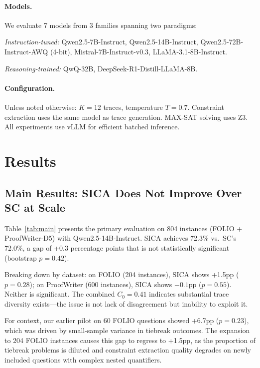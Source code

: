 \documentclass[11pt,a4paper]{article}
\begin{document}
\paragraph{Models.}
We evaluate 7 models from 3 families spanning two paradigms:

\noindent\emph{Instruction-tuned:}
Qwen2.5-7B-Instruct, Qwen2.5-14B-Instruct, Qwen2.5-72B-Instruct-AWQ (4-bit),
Mistral-7B-Instruct-v0.3, LLaMA-3.1-8B-Instruct.

\noindent\emph{Reasoning-trained:}
QwQ-32B, DeepSeek-R1-Distill-LLaMA-8B.

\paragraph{Configuration.}
Unless noted otherwise: $K=12$ traces, temperature $T=0.7$.
Constraint extraction uses the same model as trace generation.
MAX-SAT solving uses Z3.
All experiments use vLLM for efficient batched inference.

\section{Results}
\label{sec:results}

\subsection{Main Results: SICA Does Not Improve Over SC at Scale}
\label{sec:main_results}

Table~\ref{tab:main} presents the primary evaluation on 804 instances (FOLIO + ProofWriter-D5) with Qwen2.5-14B-Instruct.
SICA achieves 72.3\% vs.\ SC's 72.0\%, a gap of +0.3 percentage points that is not statistically significant (bootstrap $p=0.42$).

Breaking down by dataset: on FOLIO (204 instances), SICA shows +1.5pp ($p=0.28$); on ProofWriter (600 instances), SICA shows $-0.1$pp ($p=0.55$).
Neither is significant.
The combined $C_0=0.41$ indicates substantial trace diversity exists---the issue is not lack of disagreement but inability to exploit it.

For context, our earlier pilot on 60 FOLIO questions showed +6.7pp ($p=0.23$), which was driven by small-sample variance in tiebreak outcomes.
The expansion to 204 FOLIO instances causes this gap to regress to +1.5pp, as the proportion of tiebreak problems is diluted and constraint extraction quality degrades on newly included questions with complex nested quantifiers.
\end{document}
